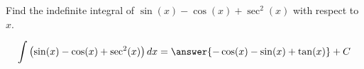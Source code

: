 \documentclass{ximera}
\author{Gregory Hartman \and Matthew Carr\and Nela Lakos}
\begin{document}
\begin{exercise}

Find the indefinite integral of $\sin(x)-\cos(x)+\sec^{2}(x)$ with respect to $x$.
\begin{prompt}
  \[
  \int \left(\sin(x)-\cos(x)+\sec^{2}(x)\right) dx
  =\answer{-\cos(x)-\sin(x)+\tan(x)}+C
  \]
\end{prompt}
\end{exercise}
\end{document}
